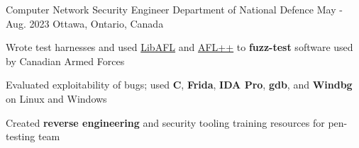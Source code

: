 

\begin{cventries}

  \cventry
    {Computer Network Security Engineer} %
    {Department of National Defence} %
    {May - Aug. 2023} %
    {Ottawa, Ontario, Canada} %
    {
      \begin{cvitems} %
        \item{Wrote test harnesses and used \href{https://aflplus.plus/libafl-book/}{LibAFL} and \href{https://aflplus.plus}{AFL++} to \textbf{fuzz-test} software used by Canadian Armed Forces}
        \item{Evaluated exploitability of bugs; used \textbf{C}, \textbf{Frida}, \textbf{IDA Pro}, \textbf{gdb}, and \textbf{Windbg} on Linux and Windows}
        \item{Created \textbf{reverse engineering} and security tooling training resources for pen-testing team} %
      \end{cvitems}
    }


\end{cventries}
